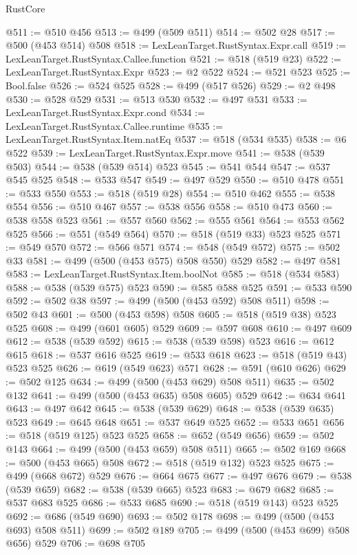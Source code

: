 \begin{lexlean}{RustCore}
\begin{coremodule}
@511 := @510 @456
@513 := @499 (@509 @511)
@514 := @502 @28
@517 := @500 (@453 @514) @508
@518 := LexLeanTarget.RustSyntax.Expr.call
@519 := LexLeanTarget.RustSyntax.Callee.function
@521 := @518 (@519 @23)
@522 := LexLeanTarget.RustSyntax.Expr
@523 := @2 @522
@524 := @521 @523
@525 := Bool.false
@526 := @524 @525
@528 := @499 (@517 @526)
@529 := @2 @498
@530 := @528 @529
@531 := @513 @530
@532 := @497 @531
@533 := LexLeanTarget.RustSyntax.Expr.cond
@534 := LexLeanTarget.RustSyntax.Callee.runtime
@535 := LexLeanTarget.RustSyntax.Item.natEq
@537 := @518 (@534 @535)
@538 := @6 @522
@539 := LexLeanTarget.RustSyntax.Expr.move
@541 := @538 (@539 @503)
@544 := @538 (@539 @514) @523
@545 := @541 @544
@547 := @537 @545 @525
@548 := @533 @547
@549 := @497 @529
@550 := @510 @478
@551 := @533 @550
@553 := @518 (@519 @28)
@554 := @510 @462
@555 := @538 @554
@556 := @510 @467
@557 := @538 @556
@558 := @510 @473
@560 := @538 @558 @523
@561 := @557 @560
@562 := @555 @561
@564 := @553 @562 @525
@566 := @551 (@549 @564)
@570 := @518 (@519 @33) @523 @525
@571 := @549 @570
@572 := @566 @571
@574 := @548 (@549 @572)
@575 := @502 @33
@581 := @499 (@500 (@453 @575) @508 @550) @529
@582 := @497 @581
@583 := LexLeanTarget.RustSyntax.Item.boolNot
@585 := @518 (@534 @583)
@588 := @538 (@539 @575) @523
@590 := @585 @588 @525
@591 := @533 @590
@592 := @502 @38
@597 := @499 (@500 (@453 @592) @508 @511)
@598 := @502 @43
@601 := @500 (@453 @598) @508
@605 := @518 (@519 @38) @523 @525
@608 := @499 (@601 @605) @529
@609 := @597 @608
@610 := @497 @609
@612 := @538 (@539 @592)
@615 := @538 (@539 @598) @523
@616 := @612 @615
@618 := @537 @616 @525
@619 := @533 @618
@623 := @518 (@519 @43) @523 @525
@626 := @619 (@549 @623) @571
@628 := @591 (@610 @626)
@629 := @502 @125
@634 := @499 (@500 (@453 @629) @508 @511)
@635 := @502 @132
@641 := @499 (@500 (@453 @635) @508 @605) @529
@642 := @634 @641
@643 := @497 @642
@645 := @538 (@539 @629)
@648 := @538 (@539 @635) @523
@649 := @645 @648
@651 := @537 @649 @525
@652 := @533 @651
@656 := @518 (@519 @125) @523 @525
@658 := @652 (@549 @656)
@659 := @502 @143
@664 := @499 (@500 (@453 @659) @508 @511)
@665 := @502 @169
@668 := @500 (@453 @665) @508
@672 := @518 (@519 @132) @523 @525
@675 := @499 (@668 @672) @529
@676 := @664 @675
@677 := @497 @676
@679 := @538 (@539 @659)
@682 := @538 (@539 @665) @523
@683 := @679 @682
@685 := @537 @683 @525
@686 := @533 @685
@690 := @518 (@519 @143) @523 @525
@692 := @686 (@549 @690)
@693 := @502 @178
@698 := @499 (@500 (@453 @693) @508 @511)
@699 := @502 @189
@705 := @499 (@500 (@453 @699) @508 @656) @529
@706 := @698 @705

\end{coremodule}
\end{lexlean}
